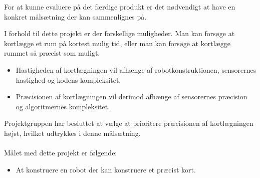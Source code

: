 For at kunne evaluere på det færdige produkt er det nødvendigt at have en konkret målsætning der kan sammenlignes på. 

I forhold til dette projekt er der forskellige muligheder.
Man kan forsøge at kortlægge et rum på kortest mulig tid, eller man kan forsøge at kortlægge rummet så præcist som muligt.

\begin{itemize}
\item Hastigheden af kortlægningen vil afhænge af robotkonstruktionen, sensorernes hastighed og kodens kompleksitet.
\item Præcisionen af kortlægningen vil derimod afhænge af sensorernes præcision og algoritmernes kompleksitet.
\end{itemize}
Projektgruppen har besluttet at vælge at prioritere præcisionen af kortlægningen højst, hvilket udtrykkes i denne målsætning.

\paragraph{}
\noindent Målet med dette projekt er følgende:
\begin{itemize}
\item At konstruere en robot der kan konstruere et præcist kort.
\end{itemize}
